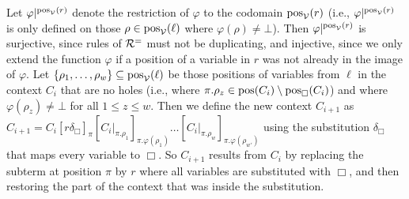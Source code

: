 \begin{myproof}
\begin{itemize}
        Let $\varphi|^{\mathrm{pos}_{\mathcal{V}}(r)}$
denote the restriction of $\varphi$ to the codomain $\mathrm{pos}_{\mathcal{V}}(r)$ (i.e.,
$\varphi|^{\mathrm{pos}_{\mathcal{V}}(r)}$
is only defined on those $\rho \in \mathrm{pos}_{\mathcal{V}}(\ell)$ where
$\varphi(\rho) \neq \bot$). Then 
 $\varphi|^{\mathrm{pos}_{\mathcal{V}}(r)}$ is surjective, since
        rules of $\mathcal{R}^=$ must not be duplicating, and injective, since we only extend the
        function $\varphi$ if a position of a variable in $r$ was not already in the image
        of $\varphi$.
        Let $\{\rho_1, \ldots, \rho_w\} \subseteq \mathrm{pos}_{\mathcal{V}}(\ell)$
        be those positions
        of variables from $\ell$  in the context $C_i$ that are no holes
        (i.e., where $\pi.\rho_z \in
        \mathrm{pos}(C_i)\setminus
        \mathrm{pos}_{\Box}(C_i)$)
        and where 
        $\varphi(\rho_z) \neq \bot$ for all $1 \leq z \leq w$.
        Then we define the new context $C_{i+1}$ as 
        $C_{i+1} = C_i[r \delta_{\Box}]_{\pi}[C_i|_{\pi.\rho_1}]_{\pi.\varphi(\rho_1)} \ldots [C_i|_{\pi.\rho_{w}}]_{\pi.\varphi(\rho_{w'})}$ 
        using the substitution $\delta_{\Box}$ that maps every variable to $\Box$.
        So $C_{i+1}$ results from $C_i$ by replacing the subterm at position $\pi$ by $r$
        where all variables are substituted with $\Box$, and then restoring
        the part of the context that was inside the substitution.
        

\end{itemize}
\end{myproof}
